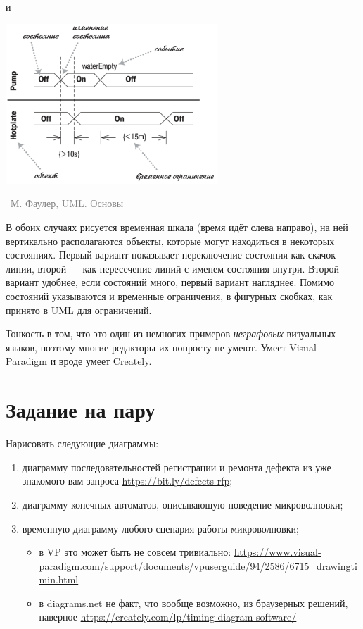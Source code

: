 \documentclass[a5paper]{article}
\newcommand{\attribution}[1] {
    \vspace{-5mm}\begin{flushright}\begin{scriptsize}\textcolor{gray}{\textcopyright\, #1}\end{scriptsize}\end{flushright}
}
\begin{document}
и

\begin{center}
    \includegraphics[width=0.6\textwidth]{timingDiagramsAlternate.png}
    \attribution{М. Фаулер, UML. Основы}
\end{center}

В обоих случаях рисуется временная шкала (время идёт слева направо), на ней вертикально располагаются объекты, которые могут находиться в некоторых состояниях. Первый вариант показывает переключение состояния как скачок линии, второй --- как пересечение линий с именем состояния внутри. Второй вариант удобнее, если состояний много, первый вариант нагляднее. Помимо состояний указываются и временные ограничения, в фигурных скобках, как принято в UML для ограничений.

Тонкость в том, что это один из немногих примеров \emph{неграфовых} визуальных языков, поэтому многие редакторы их попросту не умеют. Умеет Visual Paradigm и вроде умеет Creately.

\section{Задание на пару}

Нарисовать следующие диаграммы:

\begin{enumerate}
    \item диаграмму последовательностей регистрации и ремонта дефекта из уже знакомого вам запроса \url{https://bit.ly/defects-rfp};
    \item диаграмму конечных автоматов, описывающую поведение микроволновки;
    \item временную диаграмму любого сценария работы микроволновки;
    \begin{itemize}
        \item в VP это может быть не совсем тривиально: \url{https://www.visual-paradigm.com/support/documents/vpuserguide/94/2586/6715_drawingtimin.html}
        \item в diagrams.net не факт, что вообще возможно, из браузерных решений, наверное \url{https://creately.com/lp/timing-diagram-software/}
    \end{itemize}
\end{enumerate}
\end{document}
